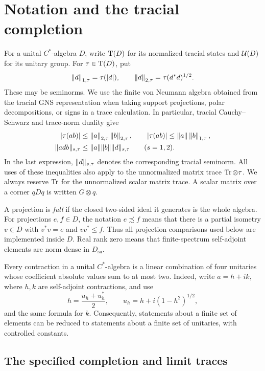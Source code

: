 \section{Notation and the tracial completion}\label{r:sec:preliminaries}

For a unital \(C^*\)-algebra \(D\), write \(\operatorname T(D)\) for its normalized tracial
states and \(\mathcal U(D)\) for its unitary group. For \(\tau\in\operatorname T(D)\), put
\[
 \left\|d\right\|_{1,\tau}=\tau(|d|),\qquad
 \left\|d\right\|_{2,\tau}=\tau(d^*d)^{1/2}.
\]
These may be seminorms. We use the finite von Neumann algebra obtained
from the tracial GNS representation when taking support projections,
polar decompositions, or signs in a trace calculation. In particular,
tracial Cauchy--Schwarz and trace-norm duality give
\begin{equation}\label{r:eq:trace-inequalities}
 \begin{aligned}
 |\tau(ab)|&\leq\left\|a\right\|_{2,\tau}\left\|b\right\|_{2,\tau},\qquad
 |\tau(ab)|\leq\lVert a\rVert\left\|b\right\|_{1,\tau},\\
 \lVert adb\rVert_{s,\tau}&\leq\lVert a\rVert\lVert b\rVert\lVert d\rVert_{s,\tau}
 \qquad(s=1,2).
 \end{aligned}
\end{equation}
In the last expression, \(\lVert d\rVert_{s,\tau}\) denotes the corresponding
tracial seminorm. All uses of these inequalities also apply to the
unnormalized matrix trace \(\operatorname{Tr}\otimes\tau\). We always reserve \(\operatorname{Tr}\)
for the unnormalized scalar matrix trace. A scalar matrix over a corner
\(qDq\) is written \(G\otimes q\).

A projection is \emph{full} if the closed two-sided ideal it generates is
the whole algebra. For projections \(e,f\in D\), the notation
\(e\precsim f\) means that there is a partial isometry \(v\in D\) with
\(v^*v=e\) and \(vv^*\leq f\). Thus all projection comparisons used below
are implemented inside \(D\).
Real rank zero means that finite-spectrum self-adjoint elements are
norm dense in \(D_{\mathrm{sa}}\).

Every contraction in a unital \(C^*\)-algebra is a linear combination of four
unitaries whose coefficient absolute values sum to at most two. Indeed,
write \(a=h+ik\), where \(h,k\) are self-adjoint contractions, and use
\[
 h=\frac{u_h+u_h^*}{2},\qquad
 u_h=h+i(1-h^2)^{1/2},
\]
and the same formula for \(k\). Consequently, statements about a finite
set of elements can be reduced to statements about a finite set of
unitaries, with controlled constants.

\subsection{The specified completion and limit traces}

